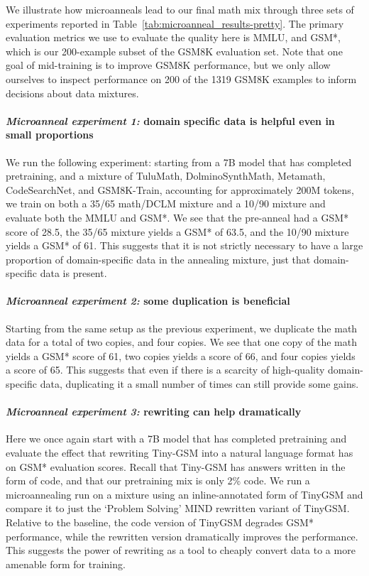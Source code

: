 \documentclass[table]{ai2style/ai2}
\begin{document}
We illustrate how microanneals lead to our final math mix through three sets of experiments reported in Table~\ref{tab:microanneal_results-pretty}.
The primary evaluation metrics we use to evaluate the quality here is MMLU, and GSM*,  which is our 200-example subset of the GSM8K evaluation set. Note that one goal of mid-training is to improve GSM8K performance, but we only allow ourselves to inspect performance on 200 of the 1319 GSM8K examples to inform decisions about data mixtures. 

\paragraph{\textit{Microanneal experiment 1:} domain specific data is helpful even in small proportions} We run the following experiment: starting from a 7B model that has completed pretraining, and a mixture of TuluMath, DolminoSynthMath, Metamath, CodeSearchNet, and GSM8K-Train, accounting for approximately 200M tokens, we train on both a 35/65 math/DCLM mixture and a 10/90 mixture and evaluate both the MMLU and GSM*. We see that the pre-anneal had a GSM* score of 28.5, the 35/65 mixture yields a GSM* of 63.5, and the 10/90 mixture yields a GSM* of 61. This suggests that it is not strictly necessary to have a large proportion of domain-specific data in the annealing mixture, just that domain-specific data is present.

\paragraph{\textit{Microanneal experiment 2:} some duplication is beneficial} Starting from the same setup as the previous experiment, we duplicate the math data for a total of two copies, and four copies. We see that one copy of the math yields a GSM* score of 61, two copies yields a score of 66, and four copies yields a score of 65. This suggests that even if there is a scarcity of high-quality domain-specific data, duplicating it a small number of times can still provide some gains. 
    
\paragraph{\textit{Microanneal experiment 3:} rewriting can help dramatically} Here we once again start with a 7B  model that has completed pretraining and evaluate the effect that rewriting Tiny-GSM into a natural language format has on GSM* evaluation scores. Recall that Tiny-GSM has answers written in the form of code, and that our pretraining mix is only 2\% code. We run a microannealing run on a mixture using an inline-annotated form of TinyGSM and compare it to just the `Problem Solving' MIND rewritten variant of TinyGSM. Relative to the baseline, the code version of TinyGSM degrades GSM* performance, while the rewritten version dramatically improves the performance. This suggests the  power of rewriting as a tool to cheaply convert data to a more amenable form for training. 
\end{document}
